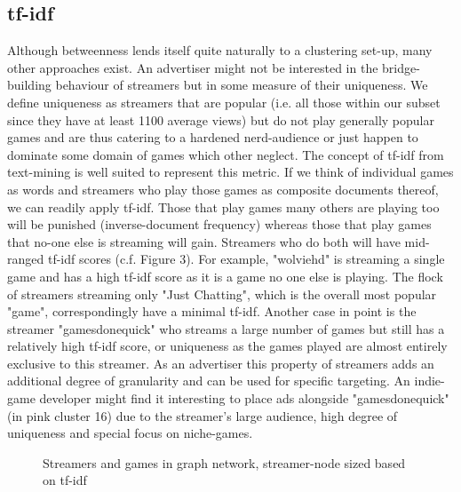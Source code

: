\documentclass[11pt, oneside]{article}   	%
\begin{document}
\subsection{tf-idf}
Although betweenness lends itself quite naturally to a clustering set-up, many other approaches exist. An advertiser might not be interested in the bridge-building behaviour of streamers but in some measure of their uniqueness. We define uniqueness as streamers that are popular (i.e. all those within our subset since they have at least 1100 average views) but do not play generally popular games and are thus catering to a hardened nerd-audience or just happen to dominate some domain of games which other neglect. The concept of tf-idf from text-mining is well suited to represent this metric. If we think of individual games as words and streamers who play those games as composite documents thereof, we can readily apply tf-idf. Those that play games many others are playing too will be punished (inverse-document frequency) whereas those that play games that no-one else is streaming will gain. Streamers who do both will have mid-ranged tf-idf scores (c.f. Figure 3).
\newline
For example, "wolviehd" is streaming a single game and has a high tf-idf score as it is a game no one else is playing. The flock of streamers  streaming only "Just Chatting", which is the overall most popular "game", correspondingly have a minimal tf-idf.
Another case in point is the streamer "gamesdonequick" who streams a large number of games but still has a relatively high tf-idf score, or uniqueness as the games played are almost entirely exclusive to this streamer.
\newline
As an advertiser this property of streamers adds an additional degree of granularity and can be used for specific targeting. An indie-game developer might find it interesting to place ads alongside "gamesdonequick" (in pink cluster 16) due to the streamer's large audience, high degree of uniqueness and special focus on niche-games.
\begin{figure}
\centering
\caption{Streamers and games in graph network, streamer-node sized based on tf-idf}
\label{figure label}
\end{figure}
\end{document}
